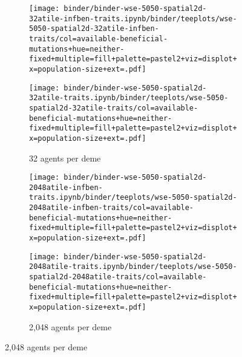\begin{figure}[h]
    \begin{subfigure}[b]{\linewidth}
        \begin{minipage}{\textwidth}
          \texttt{[image: binder/binder-wse-5050-spatial2d-32atile-infben-traits.ipynb/binder/teeplots/wse-5050-spatial2d-32atile-infben-traits/col=available-beneficial-mutations+hue=neither-fixed+multiple=fill+palette=pastel2+viz=displot+x=population-size+ext=.pdf]}

          \texttt{[image: binder/binder-wse-5050-spatial2d-32atile-traits.ipynb/binder/teeplots/wse-5050-spatial2d-32atile-traits/col=available-beneficial-mutations+hue=neither-fixed+multiple=fill+palette=pastel2+viz=displot+x=population-size+ext=.pdf]}%
        \end{minipage}
        \begin{minipage}{\textwidth}
        \caption{32 agents per deme}
        \label{fig:neither-fixed-wse-altatile:32}
        \end{minipage}%
    \end{subfigure}

\begin{subfigure}[b]{\linewidth}
    \begin{minipage}{\textwidth}
      \texttt{[image: binder/binder-wse-5050-spatial2d-2048atile-infben-traits.ipynb/binder/teeplots/wse-5050-spatial2d-2048atile-infben-traits/col=available-beneficial-mutations+hue=neither-fixed+multiple=fill+palette=pastel2+viz=displot+x=population-size+ext=.pdf]}

      \texttt{[image: binder/binder-wse-5050-spatial2d-2048atile-traits.ipynb/binder/teeplots/wse-5050-spatial2d-2048atile-traits/col=available-beneficial-mutations+hue=neither-fixed+multiple=fill+palette=pastel2+viz=displot+x=population-size+ext=.pdf]}%
    \end{minipage}
    \begin{minipage}{\textwidth}
    \caption{2,048 agents per deme}
    \label{fig:neither-fixed-wse-altatile:2048}
    \end{minipage}%
\end{subfigure}



\end{figure}
